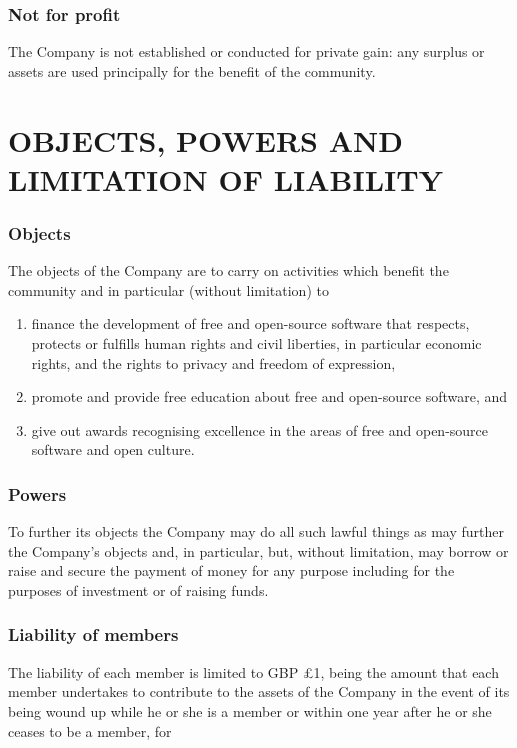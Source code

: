 \documentclass[a4paper,12pt]{article}
\renewcommand{\labelenumi}{\thesection.\arabic{enumi}}
\begin{document}
\section{Not for profit}

The Company is not established or conducted for private gain: any surplus or assets are used principally for the benefit of the community.

\part*{OBJECTS, POWERS AND LIMITATION OF LIABILITY}

\section{Objects}

The objects of the Company are to carry on activities which benefit the community and in particular (without limitation) to

\begin{enumerate}
  \renewcommand{\labelenumi}{(\alph{enumi})}
  \item finance the development of free and open-source software that respects, protects or fulfills human rights and civil liberties, in particular economic rights, and the rights to privacy and freedom of expression,
  \item promote and provide free education about free and open-source software, and
  \item give out awards recognising excellence in the areas of free and open-source software and open culture.
\end{enumerate}

\section{Powers}

To further its objects the Company may do all such lawful things as may further the Company's objects and, in particular, but, without limitation, may borrow or raise and secure the payment of money for any purpose including for the purposes of investment or of raising funds.

\section{Liability of members}


The liability of each member is limited to GBP \pounds1, being the amount that each member undertakes to contribute to the assets of the Company in the event of its being wound up while he or she is a member or within one year after he or she ceases to be a member, for
\end{document}
